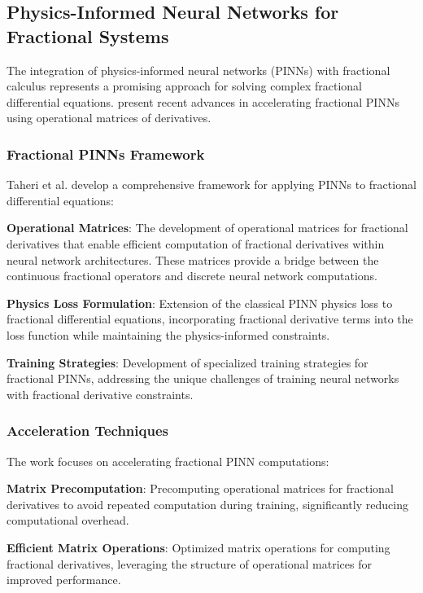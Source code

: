 \subsection{Physics-Informed Neural Networks for Fractional Systems}

The integration of physics-informed neural networks (PINNs) with fractional calculus represents a promising approach for solving complex fractional differential equations. \citet{Taheri2024AcceleratingFractionalPINNs} present recent advances in accelerating fractional PINNs using operational matrices of derivatives.

\subsubsection{Fractional PINNs Framework}

Taheri et al. develop a comprehensive framework for applying PINNs to fractional differential equations:

\textbf{Operational Matrices}: The development of operational matrices for fractional derivatives that enable efficient computation of fractional derivatives within neural network architectures. These matrices provide a bridge between the continuous fractional operators and discrete neural network computations.

\textbf{Physics Loss Formulation}: Extension of the classical PINN physics loss to fractional differential equations, incorporating fractional derivative terms into the loss function while maintaining the physics-informed constraints.

\textbf{Training Strategies}: Development of specialized training strategies for fractional PINNs, addressing the unique challenges of training neural networks with fractional derivative constraints.

\subsubsection{Acceleration Techniques}

The work focuses on accelerating fractional PINN computations:

\textbf{Matrix Precomputation}: Precomputing operational matrices for fractional derivatives to avoid repeated computation during training, significantly reducing computational overhead.

\textbf{Efficient Matrix Operations}: Optimized matrix operations for computing fractional derivatives, leveraging the structure of operational matrices for improved performance.

